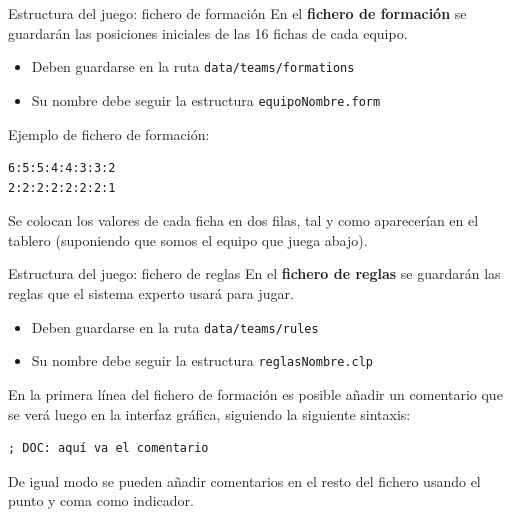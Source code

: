 \documentclass[smaller,spanish,xcolor=svgnames]{beamer}
\begin{document}
\begin{frame}[fragile]{Estructura del juego: fichero de formación}
  En el \textbf{fichero de formación} se guardarán las posiciones iniciales de
  las 16 fichas de cada equipo.
  \begin{itemize}
  \item Deben guardarse en la ruta \texttt{data/teams/formations}
  \item Su nombre debe seguir la estructura \texttt{equipoNombre.form}
  \end{itemize}

  \medskip

  Ejemplo de fichero de formación:

\begin{verbatim}
6:5:5:4:4:3:3:2
2:2:2:2:2:2:2:1
\end{verbatim}

  \medskip

  Se colocan los valores de cada ficha en dos filas, tal y como aparecerían en el
  tablero (suponiendo que somos el equipo que juega abajo).
\end{frame}


\begin{frame}[fragile]{Estructura del juego: fichero de reglas}
  En el \textbf{fichero de reglas} se guardarán las reglas que el sistema
  experto usará para jugar.

  \begin{itemize}
  \item Deben guardarse en la ruta \texttt{data/teams/rules}
  \item Su nombre debe seguir la estructura \texttt{reglasNombre.clp}
  \end{itemize}

  \medskip

  En la primera línea del fichero de formación es posible añadir un comentario
  que se verá luego en la interfaz gráfica, siguiendo la siguiente sintaxis:

\begin{verbatim}
; DOC: aquí va el comentario
\end{verbatim}

  \medskip

  De igual modo se pueden añadir comentarios en el resto del fichero usando el
  punto y coma como indicador.
\end{frame}
\end{document}
